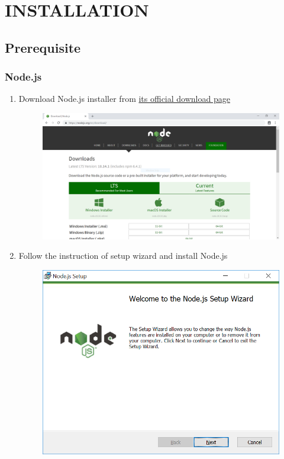 \chapter{INSTALLATION}
\section{Prerequisite}
\tocless\subsection{Node.js}
\begin{enumerate}
	\item Download Node.js installer from \href{https://nodejs.org/en/download/}{its official download page}
	      \begin{center}
	      	\begin{figure}[H]
	      		\centering
	      		\includegraphics[width=0.6\columnwidth]{images/appendixA/Nodejs-download-page.PNG}
	      	\end{figure}
	      \end{center}
	\item Follow the instruction of setup wizard and install Node.js
	      \begin{center}
	      	\begin{figure}[H]
	      		\centering
	      		\includegraphics[width=0.6\columnwidth]{images/appendixA/Nodejs-setup.PNG}

\end{figure}
\end{center}
\end{enumerate}
